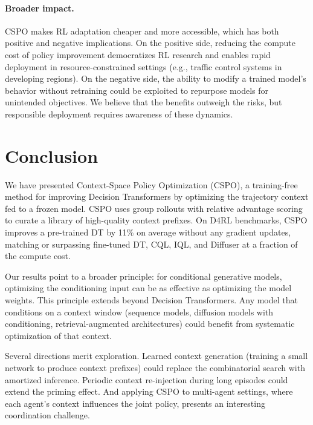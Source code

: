 \documentclass{article}
\newcommand{\cspo}{\textsc{CSPO}}
\begin{document}
\paragraph{Broader impact.}
\cspo{} makes RL adaptation cheaper and more accessible, which has both positive and negative implications. On the positive side, reducing the compute cost of policy improvement democratizes RL research and enables rapid deployment in resource-constrained settings (e.g., traffic control systems in developing regions). On the negative side, the ability to modify a trained model's behavior without retraining could be exploited to repurpose models for unintended objectives. We believe that the benefits outweigh the risks, but responsible deployment requires awareness of these dynamics.


\section{Conclusion}
\label{sec:conclusion}

We have presented Context-Space Policy Optimization (\cspo{}), a training-free method for improving Decision Transformers by optimizing the trajectory context fed to a frozen model. \cspo{} uses group rollouts with relative advantage scoring to curate a library of high-quality context prefixes. On D4RL benchmarks, \cspo{} improves a pre-trained DT by 11\% on average without any gradient updates, matching or surpassing fine-tuned DT, CQL, IQL, and Diffuser at a fraction of the compute cost.

Our results point to a broader principle: for conditional generative models, optimizing the conditioning input can be as effective as optimizing the model weights. This principle extends beyond Decision Transformers. Any model that conditions on a context window (sequence models, diffusion models with conditioning, retrieval-augmented architectures) could benefit from systematic optimization of that context.

Several directions merit exploration. Learned context generation (training a small network to produce context prefixes) could replace the combinatorial search with amortized inference. Periodic context re-injection during long episodes could extend the priming effect. And applying \cspo{} to multi-agent settings, where each agent's context influences the joint policy, presents an interesting coordination challenge.
\end{document}
